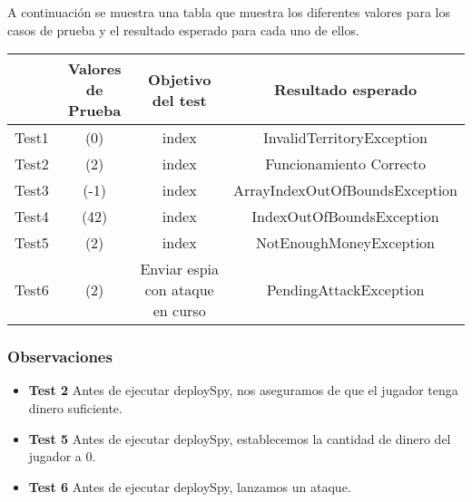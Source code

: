 A continuación se muestra una tabla que muestra los diferentes valores para los casos de prueba y el resultado esperado para cada uno de ellos.

{\footnotesize
\begin{longtable}[c]{lccc}
 & \textbf{Valores de Prueba} & \textbf{Objetivo del test} & \textbf{Resultado esperado}  \\
\hline \hline
\endhead

Test1 & (0)& index & InvalidTerritoryException \\
Test2 & (2) & index & Funcionamiento Correcto \\
Test3 & (-1)  & index & ArrayIndexOutOfBoundsException \\
Test4 & (42)  & index & IndexOutOfBoundsException\\
Test5 & (2) & index & NotEnoughMoneyException \\
Test6 & (2)  & Enviar espia con ataque en curso  & PendingAttackException\\


\hline
\end{longtable}
\subsubsection{Observaciones}
\begin{itemize}
 \item \textbf{Test 2} Antes de ejecutar deploySpy, nos aseguramos de que el jugador tenga dinero suficiente.
\item \textbf{Test 5} Antes de ejecutar deploySpy, establecemos la cantidad de dinero del jugador a 0.
\item \textbf{Test 6} Antes de ejecutar deploySpy, lanzamos un ataque.
\end{itemize}

}

